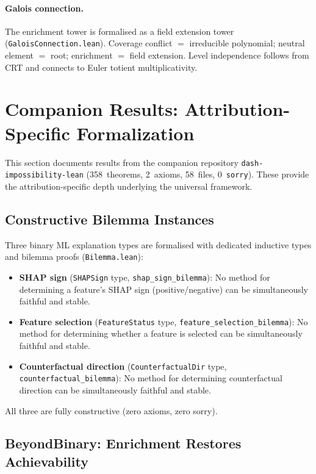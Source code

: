\documentclass[11pt,a4paper]{article}
\begin{document}
\paragraph{Galois connection.}
The enrichment tower is formalised as a field extension tower (\texttt{GaloisConnection.lean}).  Coverage conflict $=$ irreducible polynomial; neutral element $=$ root; enrichment $=$ field extension.  Level independence follows from CRT and connects to Euler totient multiplicativity.


\section{Companion Results: Attribution-Specific Formalization}
\label{sec:companion-attribution}

This section documents results from the companion repository \texttt{dash-impossibility-lean} (358~theorems, 2~axioms, 58~files, 0~\texttt{sorry}).  These provide the attribution-specific depth underlying the universal framework.

\subsection{Constructive Bilemma Instances}

Three binary ML explanation types are formalised with dedicated inductive types and bilemma proofs (\texttt{Bilemma.lean}):

\begin{itemize}
  \item \textbf{SHAP sign} (\texttt{SHAPSign} type, \texttt{shap\_sign\_bilemma}): No method for determining a feature's SHAP sign (positive/negative) can be simultaneously faithful and stable.
  \item \textbf{Feature selection} (\texttt{FeatureStatus} type, \texttt{feature\_selection\_bilemma}): No method for determining whether a feature is selected can be simultaneously faithful and stable.
  \item \textbf{Counterfactual direction} (\texttt{CounterfactualDir} type, \texttt{counterfactual\_bilemma}): No method for determining counterfactual direction can be simultaneously faithful and stable.
\end{itemize}

All three are fully constructive (zero axioms, zero sorry).

\subsection{BeyondBinary: Enrichment Restores Achievability}
\end{document}
